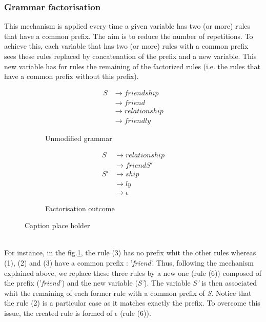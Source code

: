 \documentclass[a4paper,11pt]{article}
\begin{document}
    \subsubsection{Grammar factorisation}
      \label{grammarfactorisation}
      This mechanism is applied every time a given variable has two (or more) rules that have a common prefix. The aim is to reduce the number of repetitions. To achieve this, each variable that has two (or more) rules with a common prefix sees these rules replaced by concatenation of the prefix and a new variable. This new variable has for rules the remaining of the factorized rules (i.e. the rules that have a common prefix without this prefix).
      \begin{figure}[h!]
          \centering
          \begin{subfigure}[b]{0.4\textwidth}
              \centering
              \begin{align}
                S &\rightarrow friendship \\
                  &\rightarrow friend \\
                  &\rightarrow relationship \\
                  &\rightarrow friendly
              \end{align}
              \caption{Unmodified grammar}
              \label{fig:unmodifiedgrammar1}
          \end{subfigure}%
          \begin{subfigure}[b]{0.4\textwidth}
              \centering
              \begin{align}
                S  &\rightarrow relationship \\
                   &\rightarrow friendS' \\
                S' &\rightarrow ship \\
                   &\rightarrow ly \\
                   &\rightarrow \epsilon
              \end{align}
              \caption{Factorisation outcome}
              \label{fig:resultinggrammar1}
          \end{subfigure}
          \caption{Caption place holder}
      \end{figure}\\
      For instance, in the fig.\ref{fig:unmodifiedgrammar1}, the rule (3) has no prefix whit the other rules whereas (1), (2) and (3) have a common prefix : '\textit{friend}'. Thus, following the mechanism explained above, we replace these three rules by a new one (rule (6)) composed of the prefix ('\textit{friend}') and the new variable (\textit{S'}). The variable \textit{S'} is then associated whit the remaining of each former rule with a common prefix of \textit{S}. Notice that the rule (2) is a particular case as it matches exactly the prefix. To overcome this issue, the created rule is formed of $\epsilon$ (rule (6)).\\\\
\end{document}

